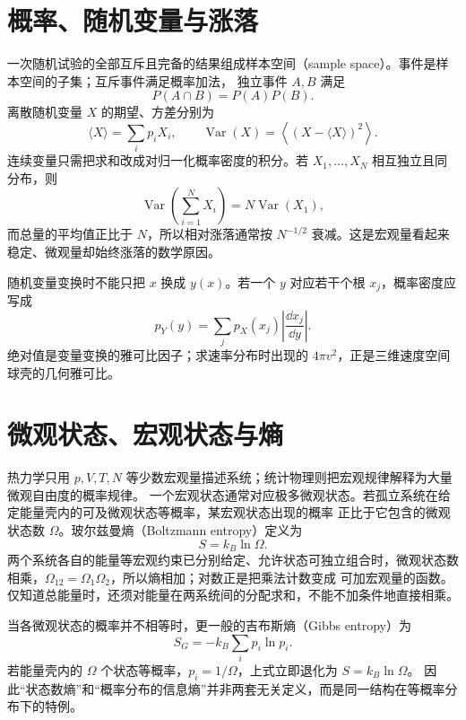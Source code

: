 \section{概率、随机变量与涨落}

一次随机试验的全部互斥且完备的结果组成样本空间（sample space）。事件是样本空间的子集；互斥事件满足概率加法，
独立事件 $A,B$ 满足
\begin{equation}
 P(A\cap B)=P(A)P(B).
\end{equation}
离散随机变量 $X$ 的期望、方差分别为
\begin{equation}
 \langle X\rangle=\sum_i p_iX_i,
 \qquad
 \operatorname{Var}(X)=\left\langle(X-\langle X\rangle)^2\right\rangle.
\end{equation}
连续变量只需把求和改成对归一化概率密度的积分。若 $X_1,\ldots,X_N$ 相互独立且同分布，则
\[
 \operatorname{Var}\!\left(\sum_{i=1}^NX_i\right)=N\operatorname{Var}(X_1),
\]
而总量的平均值正比于 $N$，所以相对涨落通常按 $N^{-1/2}$ 衰减。这是宏观量看起来稳定、微观量却始终涨落的数学原因。

随机变量变换时不能只把 $x$ 换成 $y(x)$。若一个 $y$ 对应若干个根 $x_j$，概率密度应写成
\begin{equation}
 p_Y(y)=\sum_jp_X(x_j)\left|\frac{\dd x_j}{\dd y}\right|.
\end{equation}
绝对值是变量变换的雅可比因子；求速率分布时出现的 $4\pi v^2$，正是三维速度空间球壳的几何雅可比。


\section{微观状态、宏观状态与熵}

热力学只用 $p,V,T,N$ 等少数宏观量描述系统；统计物理则把宏观规律解释为大量微观自由度的概率规律。
一个宏观状态通常对应极多微观状态。若孤立系统在给定能量壳内的可及微观状态等概率，某宏观状态出现的概率
正比于它包含的微观状态数 $\Omega$。玻尔兹曼熵（Boltzmann entropy）定义为
\begin{equation}
 S=k_B\ln\Omega.
\end{equation}
两个系统各自的能量等宏观约束已分别给定、允许状态可独立组合时，微观状态数相乘，$\Omega_{12}=\Omega_1\Omega_2$，所以熵相加；对数正是把乘法计数变成
可加宏观量的函数。
仅知道总能量时，还须对能量在两系统间的分配求和，不能不加条件地直接相乘。

当各微观状态的概率并不相等时，更一般的吉布斯熵（Gibbs entropy）为
\begin{equation}
 S_G=-k_B\sum_i p_i\ln p_i.
\end{equation}
若能量壳内的 $\Omega$ 个状态等概率，$p_i=1/\Omega$，上式立即退化为 $S=k_B\ln\Omega$。
因此“状态数熵”和“概率分布的信息熵”并非两套无关定义，而是同一结构在等概率分布下的特例。


